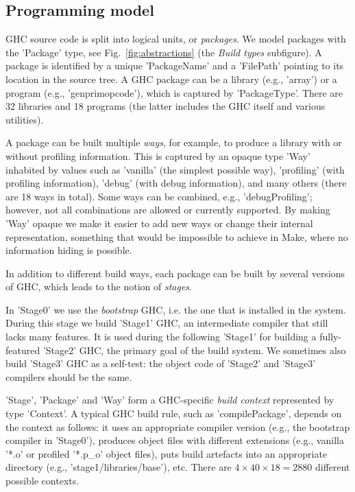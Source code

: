 \subsection{Programming model}

GHC source code is split into logical units, or \emph{packages}. We model
packages with the \lst'Package' type, see Fig.~\ref{fig:abstractions}
(the \emph{Build types} subfigure). A package is identified by a unique
\lst'PackageName' and a \lst'FilePath' pointing to its location in the source
tree. A GHC package can be a library (e.g., \lst'array') or a program (e.g.,
\lst'genprimopcode'), which is captured by \lst'PackageType'. There are 32
libraries and 18 programs (the latter includes the GHC itself and various
utilities).

A package can be built multiple \emph{ways}, for example, to produce a library
with or without profiling information. This is captured by an opaque
type \lst'Way' inhabited by values such as \lst'vanilla' (the simplest
possible way), \lst'profiling' (with profiling information), \lst'debug'
(with debug information), and many others (there are 18 ways in total). Some
ways can be combined, e.g., \lst'debugProfiling'; however, not all combinations
are allowed or currently supported. By making \lst'Way' opaque we make it easier
to add new ways or change their internal representation, something that would be
impossible to achieve in Make, where no information hiding is possible. 

In addition to different build ways, each package can be built by several
versions of GHC, which leads to the notion of \emph{stages}.

In \lst'Stage0' we use the \emph{bootstrap} GHC, i.e. the one that is
installed in the system. During this stage we build \lst'Stage1' GHC, an
intermediate compiler that still lacks many features. It is used during the
following \lst'Stage1' for building a fully-featured \lst'Stage2' GHC, the
primary goal of the build system. We sometimes also build \lst'Stage3' GHC as
a self-test: the object code of \lst'Stage2' and \lst'Stage3' compilers
should be the same.

\lst'Stage', \lst'Package' and \lst'Way' form a GHC-specific
\emph{build context} represented by type \lst'Context'. A typical GHC build
rule, such as \lst'compilePackage', depends on the context as follows: it
uses an appropriate compiler version (e.g., the bootstrap compiler in
\lst'Stage0'), produces object files with different extensions (e.g., vanilla
\lst'*.o' or profiled \lst'*.p_o' object files), puts build artefacts
into an appropriate directory (e.g., \lst'stage1/libraries/base'), etc.
There are $4 \times 40 \times 18 = 2880$ different possible contexts.

